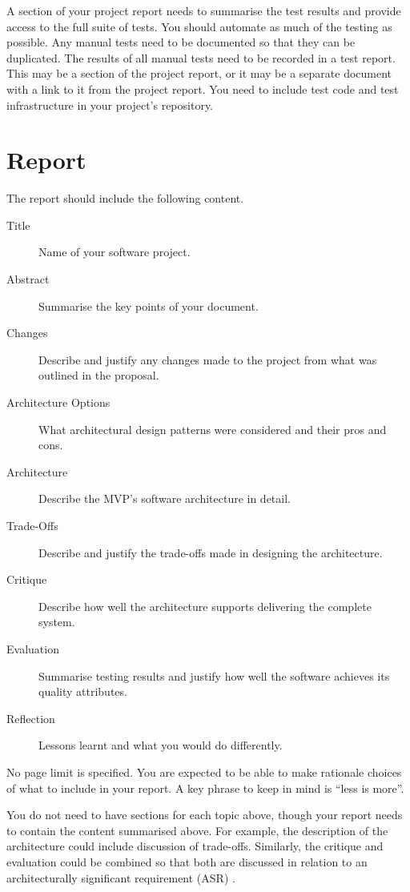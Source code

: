 \documentclass{csse4400}
\begin{document}
A section of your project report needs to summarise the test results and provide access to the full suite of tests.
You should automate as much of the testing as possible.
Any manual tests need to be documented so that they can be duplicated.
The results of all manual tests need to be recorded in a test report.
This may be a section of the project report, or it may be a separate document with a link to it from the project report.
You need to include test code and test infrastructure in your project's repository.


\section{Report}
The report should include the following content.

\begin{description}
    \item[Title] Name of your software project.
    \item[Abstract] Summarise the key points of your document.
    \item[Changes] Describe and justify any changes made to the project from what was outlined in the proposal.
    \item[Architecture Options] What architectural design patterns were considered and their pros and cons.
    \item[Architecture] Describe the MVP's software architecture in detail.
    \item[Trade-Offs] Describe and justify the trade-offs made in designing the architecture.
    \item[Critique] Describe how well the architecture supports delivering the complete system.
    \item[Evaluation] Summarise testing results and justify how well the software achieves its quality attributes.
    \item[Reflection] Lessons learnt and what you would do differently.
\end{description}

No page limit is specified.
You are expected to be able to make rationale choices of what to include in your report.
A key phrase to keep in mind is ``less is more''.

You do not need to have sections for each topic above, though your report needs to contain the content summarised above.
For example, the description of the architecture could include discussion of trade-offs.
Similarly, the critique and evaluation could be combined so that both are discussed in relation to an architecturally significant requirement (ASR) \cite{view-notes}.
\end{document}

